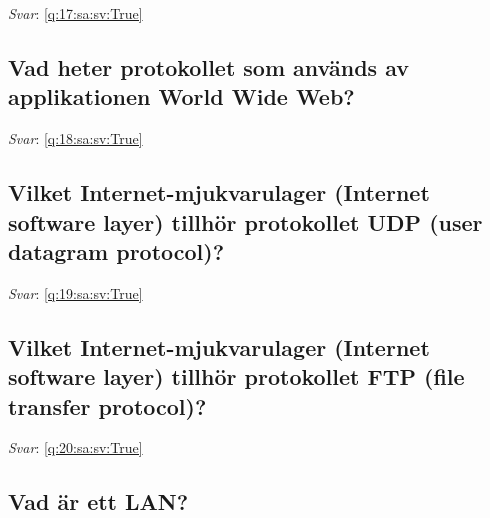 \documentclass[a4paper,11pt,oneside]{article}
\begin{document}
\begin{sloppypar}
\textit{Svar}: \autoref{q:17:sa:sv:True}



\subsection{Vad heter protokollet som anv\"ands av applikationen World Wide Web?}

\label{q:18:sa:sv:False}

\vspace{2cm}

\noindent\makebox[\textwidth]{\hrulefill}

\vspace{1cm}

\textit{Svar}: \autoref{q:18:sa:sv:True}



\subsection{Vilket Internet-mjukvarulager (Internet software layer) tillh\"or protokollet UDP (user datagram protocol)?}

\label{q:19:sa:sv:False}

\vspace{2cm}

\noindent\makebox[\textwidth]{\hrulefill}

\vspace{1cm}

\textit{Svar}: \autoref{q:19:sa:sv:True}



\subsection{Vilket Internet-mjukvarulager (Internet software layer) tillh\"or protokollet FTP (file transfer protocol)?}

\label{q:20:sa:sv:False}

\vspace{2cm}

\noindent\makebox[\textwidth]{\hrulefill}

\vspace{1cm}

\textit{Svar}: \autoref{q:20:sa:sv:True}



\subsection{Vad \"ar ett LAN?}


\end{sloppypar}
\end{document}
